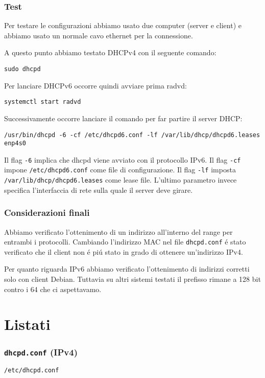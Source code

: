 \documentclass[9pt, a4paper, oneside]{article}
\begin{document}
		\section{Test}
			\par
				Per testare le configurazioni abbiamo usato due 
				computer (server e client) e abbiamo usato un 
				normale cavo ethernet per la connessione.
			\par
				A questo punto abbiamo testato DHCPv4 con il 
				seguente comando:
				\begin{verbatim}
sudo dhcpd
				\end{verbatim}
			\par
				Per lanciare DHCPv6 occorre quindi avviare 
				prima radvd:
				\begin{verbatim}
systemctl start radvd
				\end{verbatim}
				Successivamente occorre lanciare il comando 
				per far partire il server DHCP:
				\begin{verbatim}
/usr/bin/dhcpd -6 -cf /etc/dhcpd6.conf -lf /var/lib/dhcp/dhcpd6.leases enp4s0
				\end{verbatim}
				Il flag \texttt{-6} implica che dhcpd viene 
				avviato con il protocollo IPv6. Il flag 
				\texttt{-cf} impone \texttt{/etc/dhcpd6.conf} 
				come file di configurazione. Il flag 
				\texttt{-lf} imposta 
				\texttt{/var/lib/dhcp/dhcpd6.leases} come lease 
				file. L'ultimo parametro invece specifica 
				l'interfaccia di rete sulla quale il server deve 
				girare.
		\section{Considerazioni finali}
			\par
				Abbiamo verificato l'ottenimento di un 
				indirizzo all'interno del range per entrambi i 
				protocolli. Cambiando l'indirizzo MAC nel file 
				\texttt{dhcpd.conf} \'e stato verificato che il 
				client non \'e pi\'u stato in grado di ottenere 
				un'indirizzo IPv4.
			\par
				Per quanto riguarda IPv6 abbiamo 
				verificato l'ottenimento di indirizzi 
				corretti solo con client Debian. Tuttavia su 
				altri sistemi testati il prefisso rimane a 128 
				bit contro i 64 che ci aspettavamo.
		\newpage				
	\part{Listati}
		 \par
		 \section{\texttt{dhcpd.conf} (IPv4)}
			\par
				\texttt{/etc/dhcpd.conf}
			\par
			\texttt{}
			\newpage
\end{document}

